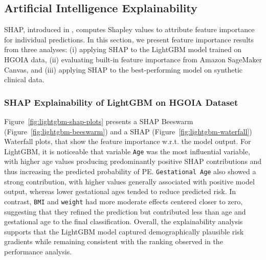 \documentclass[diagnostics,article,submit,pdftex,moreauthors]{Definitions/mdpi}
\begin{document}
\subsection{Artificial Intelligence Explainability}
\label{sec:model-explainability}
\Ac{SHAP}, introduced in \cite{lundberg2017shap}, computes Shapley
values to attribute feature importance for individual predictions. In
this section, we present feature importance results from three
analyses: (i) applying SHAP to the LightGBM model trained on \ac{HGOIA}
data, (ii) evaluating built-in feature importance from
Amazon SageMaker Canvas, and (iii) applying SHAP to the best-performing
model on synthetic clinical data.

\subsubsection{SHAP Explainability of LightGBM on \ac{HGOIA} Dataset}
\label{sec:lightgbm-isidro-ayor}
Figure~\ref{fig:lightgbm-shap-plots} presents a \ac{SHAP} Beeswarm
(Figure~\ref{fig:lightgbm-beeswarm}) and a
\ac{SHAP} (Figure~\ref{fig:lightgbm-waterfall}) Waterfall plots, that
show the feature importance \ac{w.r.t.} the model output. For
LightGBM, it is noticeable that variable \texttt{Age} was the most
influential variable, with higher age values producing predominantly
positive \ac{SHAP} contributions and thus increasing the predicted
probability of \ac{PE}. \texttt{Gestational Age} also showed a
strong contribution, with higher values generally associated with
positive model output, whereas lower gestational ages tended to reduce
predicted risk. In contrast, \texttt{BMI} and \texttt{weight} had more
moderate effects centered closer to zero, suggesting that they refined
the prediction but contributed less than age and gestational age to
the final classification. Overall, the explainability analysis
supports that the LightGBM model captured demographically plausible risk
gradients while remaining consistent with the ranking observed in the
performance analysis.
\end{document}
